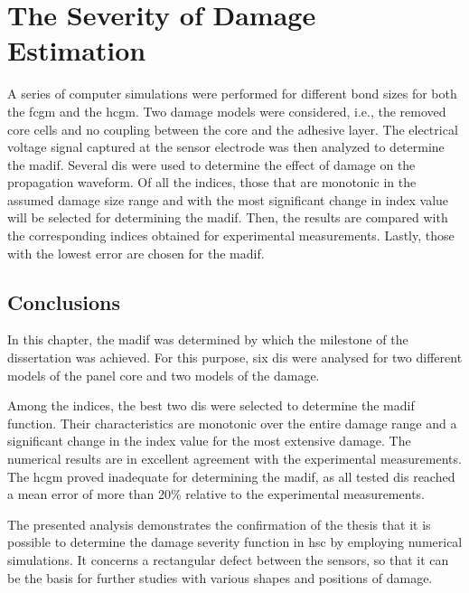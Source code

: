 \chapter[The Severity of Damage Estimation]{The Severity of Damage Estimation}
\label{ch:severity}

A series of computer simulations were performed for different bond sizes for both the \ac{fcgm} and the \ac{hcgm}.
Two damage models were considered, i.e., the removed core cells  and no coupling between the core and the adhesive layer.
The electrical voltage signal captured at the sensor electrode was then analyzed to determine the \ac{madif}.
Several \acfp{di} were used to determine the effect of damage on the propagation waveform.
Of all the indices, those that are monotonic in the assumed damage size range and with the most significant change in index value will be selected for determining the \ac{madif}.
Then, the results are compared with the corresponding indices obtained for experimental measurements.
Lastly, those with the lowest error are chosen for the \ac{madif}.




\section{Conclusions}
\label{sec:conclusionsSever}
In this chapter, the \ac{madif} was determined by which the milestone of the dissertation was achieved.
For this purpose, six \acp{di} were analysed for two different models of the panel core and two models of the damage.

Among the indices, the best two \acp{di} were selected to determine the \ac{madif} function.
Their characteristics are monotonic over the entire damage range and a significant change in the index value for the most extensive damage.
The numerical results are in excellent agreement with the experimental measurements.
The \ac{hcgm} proved inadequate for determining the \ac{madif}, as all tested \acp{di} reached a mean error of more than 20\% relative to the experimental measurements.

The presented analysis demonstrates the confirmation of the thesis that it is possible to determine the damage severity function in \ac{hsc} by employing numerical simulations.
It concerns a rectangular defect between the sensors, so that it can be the basis for further studies with various shapes and positions of damage.